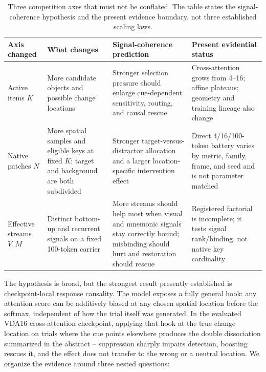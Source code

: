 \documentclass[10pt]{article}
\begin{document}
\begin{table}[t]
\centering\small
\begin{tabularx}{\textwidth}{@{}p{} p{} Y Y@{}}
\toprule
Axis changed & What changes & Signal-coherence prediction & Present evidential status\\
\midrule
Active items $K$ & More candidate objects and possible change locations & Stronger selection pressure should enlarge cue-dependent sensitivity, routing, and causal rescue & Cross-attention grows from 4--16; affine plateaus; geometry and training lineage also change\\
Native patches $N$ & More spatial samples and eligible keys at fixed $K$; target and background are both subdivided & Stronger target-versus-distractor allocation and a larger location-specific intervention effect & Direct 4/16/100-token battery varies by metric, family, frame, and seed and is not parameter matched\\
Effective streams $V,M$ & Distinct bottom-up and recurrent signals on a fixed 100-token carrier & More streams should help most when visual and mnemonic signals stay correctly bound; misbinding should hurt and restoration should rescue & Registered factorial is incomplete; it tests signal rank/binding, not native key cardinality\\
\bottomrule
\end{tabularx}
\caption{Three competition axes that must not be conflated. The table states the signal-coherence hypothesis and the present evidence boundary, not three established scaling laws.}\label{tab:coherence-axes}
\end{table}

The hypothesis is broad, but the strongest result presently established is checkpoint-local response causality. The model exposes a fully general hook: any attention score can be additively biased at any chosen spatial location before the softmax, independent of how the trial itself was generated. In the evaluated VDA16 cross-attention checkpoint, applying that hook at the true change location on trials where the cue points elsewhere produces the double dissociation summarized in the abstract -- suppression sharply impairs detection, boosting rescues it, and the effect does not transfer to the wrong or a neutral location. We organize the evidence around three nested questions:
\end{document}
